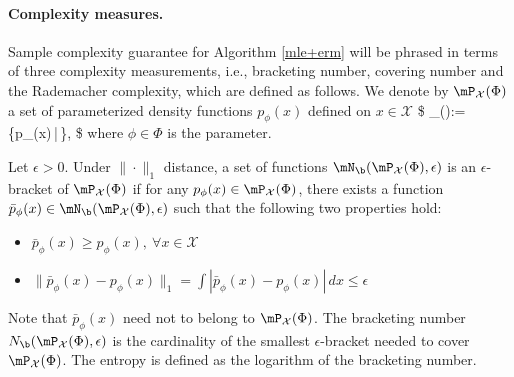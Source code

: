 

\paragraph{Complexity measures.} Sample complexity guarantee for Algorithm \ref{mle+erm} will be phrased in terms of three complexity measurements, i.e., bracketing number, covering number and the Rademacher complexity, which are defined as follows. We denote by $\mP_{\mathcal{X}}(\Phi)$ a set of parameterized density functions $p_{\phi}(x)$ defined on $x\in\mathcal{X}$
\$
\mP_{}(\Phi):=\{p_{\phi}(x)\,|\,\phi\in\Phi\},
\$
where $\phi\in\Phi$ is the parameter.


\begin{definition} \label{def:bracketing}
Let $\epsilon>0$. Under $\|\cdot\|_1$ distance, a set of functions $\mN_{\b}(\mP_{\mathcal{X}}(\Phi),\epsilon)$ is an $\epsilon$-bracket of $\mP_{\mathcal{X}}(\Phi)$ if for any $p_{\phi}(x)\in\mP_{\mathcal{X}}(\Phi)$, there exists a function $\bar p_{\phi}(x)\in\mN_{\b}(\mP_{\mathcal{X}}(\Phi),\epsilon)$ such that the following two properties hold:
\begin{itemize}
    \item $\bar p_{\phi}(x)\geq p_{\phi}(x),~\forall x\in\mathcal{X}$
    \item $\|\bar p_{\phi}(x)-p_{\phi}(x)\|_1=\int |\bar p_{\phi}(x)- p_{\phi}(x)|\, dx\leq \epsilon$
\end{itemize}
Note that $\bar p_{\phi}(x)$ need not to belong to $\mP_{\mathcal{X}}(\Phi)$. The bracketing number $N_{\b}(\mP_{\mathcal{X}}(\Phi),\epsilon)$ is the cardinality of the smallest $\epsilon$-bracket needed to cover $\mP_{\mathcal{X}}(\Phi)$. The entropy is defined as the logarithm of the bracketing number.
\end{definition}

